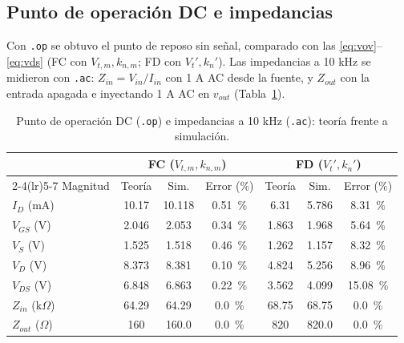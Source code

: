 \documentclass[conference]{IEEEtran}
\newcommand{\Vtp}{V_t'}
\newcommand{\knp}{k_n'}
\newcommand{\Vtm}{V_{t,m}}
\newcommand{\knm}{k_{n,m}}
\begin{document}
\subsection{Punto de operación DC e impedancias}
\label{sec:sim_op}
Con \texttt{.op} se obtuvo el punto de reposo sin señal, comparado con las \eqref{eq:vov}--\eqref{eq:vds} (FC con $\Vtm,\knm$; FD con $\Vtp,\knp$). Las impedancias a 10 kHz se midieron con \texttt{.ac}: $Z_{in}=V_{in}/I_{in}$ con 1 A AC desde la fuente, y $Z_{out}$ con la entrada apagada e inyectando 1 A AC en $v_{out}$ (Tabla~\ref{tab:op}).

\begin{table}[htbp]
\centering
\caption{Punto de operación DC (\texttt{.op}) e impedancias a 10 kHz (\texttt{.ac}): teoría frente a simulación.}
\label{tab:op}
\scriptsize
\renewcommand{\arraystretch}{1.03}
\setlength{\tabcolsep}{2.5pt}
\begin{tabular}{@{}lcccccc@{}}
\toprule
 & \multicolumn{3}{c}{FC ($\Vtm,\knm$)} & \multicolumn{3}{c}{FD ($\Vtp,\knp$)} \\
\cmidrule(lr){2-4}\cmidrule(lr){5-7}
Magnitud & Teoría & Sim. & Error (\%) & Teoría & Sim. & Error (\%) \\
\midrule
$I_D$ (mA) & 10.17 & 10.118 & \SI{0.51}{\percent} & 6.31 & 5.786 & \SI{8.31}{\percent} \\
$V_{GS}$ (V) & 2.046 & 2.053 & \SI{0.34}{\percent} & 1.863 & 1.968 & \SI{5.64}{\percent} \\
$V_S$ (V) & 1.525 & 1.518 & \SI{0.46}{\percent} & 1.262 & 1.157 & \SI{8.32}{\percent} \\
$V_D$ (V) & 8.373 & 8.381 & \SI{0.10}{\percent} & 4.824 & 5.256 & \SI{8.96}{\percent} \\
$V_{DS}$ (V) & 6.848 & 6.863 & \SI{0.22}{\percent} & 3.562 & 4.099 & \SI{15.08}{\percent} \\
$Z_{in}$ (k$\Omega$) & 64.29 & 64.29 & \SI{0.0}{\percent} & 68.75 & 68.75 & \SI{0.0}{\percent} \\
$Z_{out}$ ($\Omega$) & 160 & 160.0 & \SI{0.0}{\percent} & 820 & 820.0 & \SI{0.0}{\percent} \\
\bottomrule
\end{tabular}
\end{table}
\end{document}
